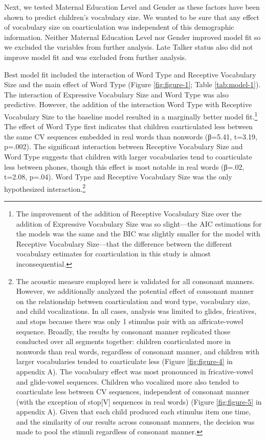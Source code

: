 \documentclass[a4paper,man,natbib,donotrepeattitle, apacite]{apa6}
\begin{document}
Next, we tested Maternal Education Level and Gender as these factors have been shown to predict children’s vocabulary size. We wanted to be sure that any effect of vocabulary size on coarticulation was independent of this demographic information. Neither Maternal Education Level nor Gender improved model fit so we excluded the variables from further analysis. Late Talker status also did not improve model fit and was excluded from further analysis. 

Best model fit included the interaction of Word Type and Receptive Vocabulary Size and the main effect of Word Type (Figure \ref{fig:figure-1}; Table \ref{tab:model-1}). The interaction of Expressive Vocabulary Size and Word Type was also predictive. However, the addition of the interaction Word Type with Receptive Vocabulary Size to the baseline model resulted in a marginally better model fit.\footnote{The improvement of the addition of Receptive Vocabulary Size over the addition of Expressive Vocabulary Size was so slight---the AIC estimations for the models was the same and the BIC was slightly smaller for the model with Receptive Vocabulary Size---that the difference between the different vocabulary estimates for coarticulation in this study is almost inconsequential.} The effect of Word Type first indicates that children coarticulated less between the same CV sequences embedded in real words than nonwords (β=5.41, t=3.19,  p=.002). The significant interaction between Receptive Vocabulary Size and Word Type suggests that children with larger vocabularies tend to coarticulate less between phones, though this effect is most notable in real words (β=.02, t=2.08,  p=.04). Word Type and Receptive Vocabulary Size was the only hypothesized interaction.\footnote{The acoustic measure employed here is validated for all consonant manners. However, we additionally analyzed the potential effect of consonant manner on the relationship between coarticulation and word type, vocabulary size, and child vocalizations. In all cases, analysis was limited to glides, fricatives, and stops because there was only 1 stimulus pair with an affricate-vowel sequence. Broadly, the results by consonant manner replicated those conducted over all segments together: children coarticulated more in nonwords than real words, regardless of consonant manner, and children with larger vocabularies tended to coarticulate less (Figure \ref{fig:figure-4} in appendix A). The vocabulary effect was most pronounced in fricative-vowel and glide-vowel sequences. Children who vocalized more also tended to coarticulate less between CV sequences, independent of consonant manner (with the exception of stop[V] sequences in real words) (Figure \ref{fig:figure-5} in appendix A). Given that each child produced each stimulus item one time, and the similarity of our results across consonant manners, the decision was made to pool the stimuli regardless of consonant manner.}
\end{document}
